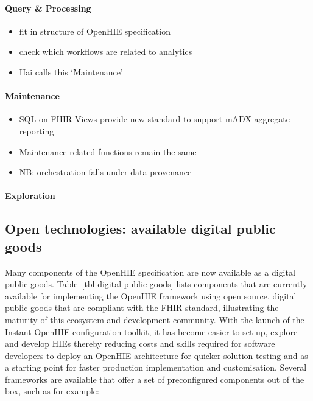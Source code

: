 \documentclass[
  authoryear]{elsarticle}
\let\oldparagraph\paragraph
\renewcommand{\paragraph}[1]{\oldparagraph{#1}\mbox{}}
\providecommand{\tightlist}{%
  \setlength{\itemsep}{0pt}\setlength{\parskip}{0pt}}\usepackage{longtable,booktabs,array}
\begin{document}
\paragraph{Query \& Processing}\label{query-processing}

\begin{itemize}
\tightlist
\item
  fit in structure of OpenHIE specification
\item
  check which workflows are related to analytics
\item
  Hai calls this `Maintenance'
\end{itemize}

\paragraph{Maintenance}\label{maintenance}

\begin{itemize}
\tightlist
\item
  SQL-on-FHIR Views provide new standard to support mADX aggregate
  reporting
\item
  Maintenance-related functions remain the same
\item
  NB: orchestration falls under data provenance
\end{itemize}

\paragraph{Exploration}\label{exploration}

\subsection{Open technologies: available digital public
goods}\label{open-technologies-available-digital-public-goods}

Many components of the OpenHIE specification are now available as a
digital public goods. Table~\ref{tbl-digital-public-goods} lists
components that are currently available for implementing the OpenHIE
framework using open source, digital public goods that are compliant
with the FHIR standard, illustrating the maturity of this ecosystem and
development community. With the launch of the Instant OpenHIE
configuration toolkit\citep{InstantOpenHIEv2}, it has become easier to
set up, explore and develop HIEs thereby reducing costs and skills
required for software developers to deploy an OpenHIE architecture for
quicker solution testing and as a starting point for faster production
implementation and customisation. Several frameworks are available that
offer a set of preconfigured components out of the box, such as for
example:
\end{document}
